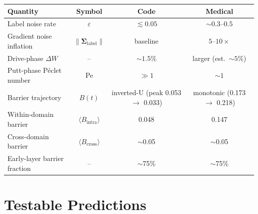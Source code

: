 \documentclass{article}
\newcommand{\bSigma}{\boldsymbol{\Sigma}}
\begin{document}
\begin{center}
\begin{tabular}{lccc}
\hline
\textbf{Quantity} & \textbf{Symbol} & \textbf{Code} & \textbf{Medical} \\
\hline
Label noise rate & $\varepsilon$ & $\lesssim 0.05$ & $\sim 0.3$--$0.5$ \\
Gradient noise inflation & $\|\bSigma_{\text{label}}\|$ & baseline & $5$--$10\times$ \\
Drive-phase $\Delta W$ & -- & $\sim 1.5\%$ & larger (est.\ $\sim 5\%$) \\
Putt-phase P\'eclet number & Pe & $\gg 1$ & $\sim 1$ \\
Barrier trajectory & $B(t)$ & inverted-U (peak 0.053 $\to$ 0.033) & monotonic (0.173 $\to$ 0.218) \\
Within-domain barrier & $\langle B_{\text{intra}}\rangle$ & 0.048 & 0.147 \\
Cross-domain barrier & $\langle B_{\text{cross}}\rangle$ & $\sim$0.05 & $\sim$0.05 \\
Early-layer barrier fraction & -- & $\sim$75\% & $\sim$75\% \\
\hline
\end{tabular}
\end{center}

\section{Testable Predictions}
\end{document}
